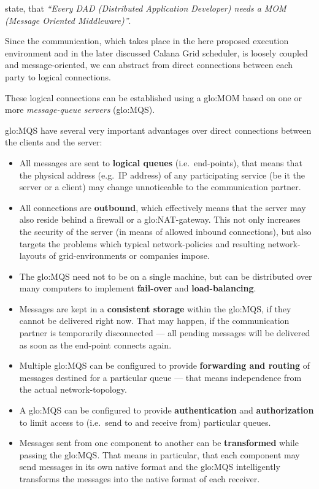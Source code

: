 \bigskip

\citet{dad-mom}  state, that  \emph{``Every  DAD (Distributed  Application
  Developer) needs a MOM (Message Oriented Middleware)''}.

Since the communication, which takes  place in the here proposed execution
environment and in  the later discussed Calana Grid  scheduler, is loosely
coupled  and message-oriented,  we  can abstract  from direct  connections
between each party to logical connections.

These logical  connections can be established using  a \gls{glo:MOM} based
on one or more \emph{message-queue servers} (\gls{glo:MQS}).

\gls{glo:MQS}   have  several  very   important  advantages   over  direct
connections between the clients and the server:

\begin{itemize}
\item All messages are  sent to \textbf{logical queues} (i.e.~end-points),
  that  means   that  the  physical  address  (e.g.~IP   address)  of  any
  participating  service  (be  it  the  server or  a  client)  may  change
  unnoticeable to the communication partner.
\item All connections are  \textbf{outbound}, which effectively means that
  the server may also reside behind a firewall or a \gls{glo:NAT}-gateway.
  This not only increases the security  of the server (in means of allowed
  inbound  connections),  but  also  targets the  problems  which  typical
  network-policies and  resulting network-layouts of  grid-environments or
  companies impose.
\item The  \gls{glo:MQS} need not  to be on  a single machine, but  can be
  distributed  over  many computers  to  implement \textbf{fail-over}  and
  \textbf{load-balancing}.
\item  Messages  are kept  in  a  \textbf{consistent  storage} within  the
  \gls{glo:MQS}, if they cannot be  delivered right now.  That may happen,
  if the communication partner is temporarily disconnected --- all pending
  messages will be delivered as soon as the end-point connects again.
\item    Multiple   \gls{glo:MQS}   can    be   configured    to   provide
  \textbf{forwarding and  routing} of  messages destined for  a particular
  queue --- that means independence from the actual network-topology.
\item A \gls{glo:MQS} can be configured to provide \textbf{authentication}
  and \textbf{authorization} to limit  access to (i.e.~send to and receive
  from) particular queues.
\item   Messages   sent   from   one   component   to   another   can   be
  \textbf{transformed}  while passing  the \gls{glo:MQS}.   That  means in
  particular,  that each  component may  send messages  in its  own native
  format and the \gls{glo:MQS}  intelligently transforms the messages into
  the native format of each receiver.
\end{itemize}



